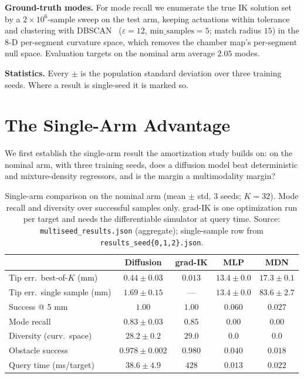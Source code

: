 \documentclass[robotics,article,submit,moreauthors]{Definitions/mdpi}
\begin{document}
\textbf{Ground-truth modes.} For mode recall we enumerate the true IK
solution set by a $2\times10^6$-sample sweep on the test arm, keeping
actuations within tolerance and clustering with
DBSCAN~\cite{ester1996dbscan} ($\varepsilon{=}12$,
$\text{min\_samples}{=}5$; match radius $15$) in the 8-D per-segment
curvature space, which removes the chamber map's per-segment null space.
Evaluation targets on the nominal arm average $2.05$ modes.

\textbf{Statistics.} Every $\pm$ is the population standard deviation over
three training seeds. Where a result is single-seed it is marked so.

\section{The Single-Arm Advantage}
\label{sec:single}

We first establish the single-arm result the amortization study builds on:
on the nominal arm, with three training seeds, does a diffusion model beat
deterministic and mixture-density regressors, and is the margin a
multimodality margin?

\begin{table}[H]
\caption{Single-arm comparison on the nominal arm (mean $\pm$ std, 3 seeds;
$K{=}32$). Mode recall and diversity over successful samples only. grad-IK
is one optimization run per target and needs the differentiable simulator at
query time. Source: \texttt{multiseed\_results.json} (aggregate);
single-sample row from \texttt{results\_seed\{0,1,2\}.json}.}
\label{tab:single}
\begin{tabularx}{\textwidth}{lCCCC}
\toprule
 & \textbf{Diffusion} & \textbf{grad-IK} & \textbf{MLP} & \textbf{MDN} \\
\midrule
Tip err.\ best-of-$K$ (mm) & $0.44\pm0.03$ & $\mathbf{0.013}$ & $13.4\pm0.0$ & $17.3\pm0.1$ \\
Tip err.\ single sample (mm) & $\mathbf{1.69\pm0.15}$ & --- & $13.4\pm0.0$ & $83.6\pm2.7$ \\
Success @ 5 mm & $\mathbf{1.00}$ & $\mathbf{1.00}$ & $0.060$ & $0.027$ \\
Mode recall & $0.83\pm0.03$ & $\mathbf{0.85}$ & $0.00$ & $0.00$ \\
Diversity (curv.\ space) & $28.2\pm0.2$ & $\mathbf{29.0}$ & $0.0$ & $0.0$ \\
Obstacle success & $0.978\pm0.002$ & $\mathbf{0.980}$ & $0.040$ & $0.018$ \\
Query time (ms/target) & $38.6\pm4.9$ & $428$ & $\mathbf{0.013}$ & $0.022$ \\
\bottomrule
\end{tabularx}
\end{table}
\end{document}
